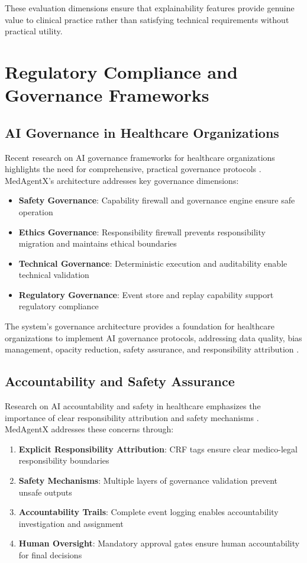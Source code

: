 \documentclass[conference]{IEEEtran}
\begin{document}
These evaluation dimensions ensure that explainability features provide genuine value to clinical practice rather than satisfying technical requirements without practical utility.

\section{Regulatory Compliance and Governance Frameworks}

\subsection{AI Governance in Healthcare Organizations}
Recent research on AI governance frameworks for healthcare organizations highlights the need for comprehensive, practical governance protocols \cite{ai_governance_healthcare_2024}. MedAgentX's architecture addresses key governance dimensions:

\begin{itemize}
    \item \textbf{Safety Governance}: Capability firewall and governance engine ensure safe operation
    \item \textbf{Ethics Governance}: Responsibility firewall prevents responsibility migration and maintains ethical boundaries
    \item \textbf{Technical Governance}: Deterministic execution and auditability enable technical validation
    \item \textbf{Regulatory Governance}: Event store and replay capability support regulatory compliance
\end{itemize}

The system's governance architecture provides a foundation for healthcare organizations to implement AI governance protocols, addressing data quality, bias management, opacity reduction, safety assurance, and responsibility attribution \cite{ethics_governance_medical_ai_2023}.

\subsection{Accountability and Safety Assurance}
Research on AI accountability and safety in healthcare emphasizes the importance of clear responsibility attribution and safety mechanisms \cite{ai_accountability_healthcare_2020}. MedAgentX addresses these concerns through:

\begin{enumerate}
    \item \textbf{Explicit Responsibility Attribution}: CRF tags ensure clear medico-legal responsibility boundaries
    \item \textbf{Safety Mechanisms}: Multiple layers of governance validation prevent unsafe outputs
    \item \textbf{Accountability Trails}: Complete event logging enables accountability investigation and assignment
    \item \textbf{Human Oversight}: Mandatory approval gates ensure human accountability for final decisions
\end{enumerate}
\end{document}
